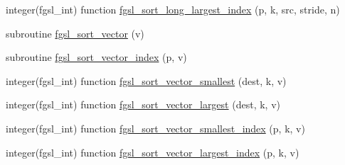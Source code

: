 \begin{DoxyCompactItemize}
\item 
integer(fgsl\-\_\-int) function \hyperlink{sort_8finc_a49b77db1a738b1500cf01500e77a63cc}{fgsl\-\_\-sort\-\_\-long\-\_\-largest\-\_\-index} (p, k, src, stride, n)
\item 
subroutine \hyperlink{sort_8finc_ae260f94887ee5bdfdb33bbe94eb83143}{fgsl\-\_\-sort\-\_\-vector} (v)
\item 
subroutine \hyperlink{sort_8finc_a818d4e659a7756cbf3d20d33ae53b418}{fgsl\-\_\-sort\-\_\-vector\-\_\-index} (p, v)
\item 
integer(fgsl\-\_\-int) function \hyperlink{sort_8finc_a0e00f85dfc87a4eefab581ca773362d1}{fgsl\-\_\-sort\-\_\-vector\-\_\-smallest} (dest, k, v)
\item 
integer(fgsl\-\_\-int) function \hyperlink{sort_8finc_ac0555f574fa147cddc39c7a027c5d9ae}{fgsl\-\_\-sort\-\_\-vector\-\_\-largest} (dest, k, v)
\item 
integer(fgsl\-\_\-int) function \hyperlink{sort_8finc_ac094e38c25cd8d2532ce3729a564a199}{fgsl\-\_\-sort\-\_\-vector\-\_\-smallest\-\_\-index} (p, k, v)
\item 
integer(fgsl\-\_\-int) function \hyperlink{sort_8finc_a5b6b9851e59760427ededc824ea5866d}{fgsl\-\_\-sort\-\_\-vector\-\_\-largest\-\_\-index} (p, k, v)
\end{DoxyCompactItemize}


